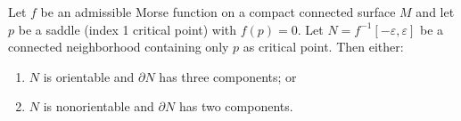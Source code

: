 Let $f$ be an admissible Morse function on a compact connected surface $M$ and let $p$ be a saddle (index 1 critical point) with $f(p) = 0$. Let $N = f^{-1}[-\varepsilon, \varepsilon]$ be a connected neighborhood containing only $p$ as critical point. Then either:
\begin{enumerate}
\item[(a)] $N$ is orientable and $\partial N$ has three components; or
\item[(b)] $N$ is nonorientable and $\partial N$ has two components.
\end{enumerate}
